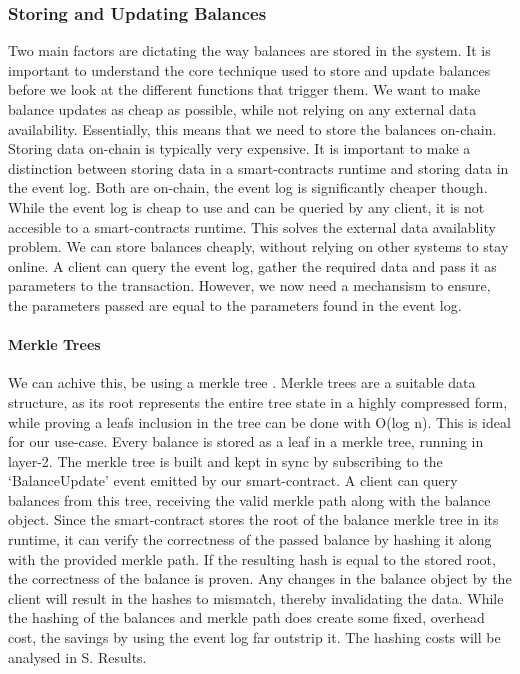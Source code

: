 \documentclass[../../thesis.tex]{subfiles}
\begin{document}
\subsubsection{Storing and Updating Balances} \label{balances}
Two main factors are dictating the way balances are stored in the system. It is important to understand the core technique used to store and update balances before we look at the different functions that trigger them. We want to make balance updates as cheap as possible, while not relying on any external data availability. Essentially, this means that we need to store the balances on-chain. Storing data on-chain is typically very expensive. It is important to make a distinction between storing data in a smart-contracts runtime and storing data in the event log. Both are on-chain, the event log is significantly cheaper though. While the event log is cheap to use and can be queried by any client, it is not accesible to a smart-contracts runtime. This solves the external data availablity problem. We can store balances cheaply, without relying on other systems to stay online. A client can query the event log, gather the required data and pass it as parameters to the transaction. However, we now need a mechansism to ensure, the parameters passed are equal to the parameters found in the event log. 

\paragraph{Merkle Trees}
We can achive this, be using a merkle tree \cite{szydlo2004merkle}. Merkle trees are a suitable data structure, as its root represents the entire tree state in a highly compressed form, while proving a leafs inclusion in the tree can be done with O(log n). This is ideal for our use-case. Every balance is stored as a leaf in a merkle tree, running in layer-2. The merkle tree is built and kept in sync by subscribing to the `BalanceUpdate' event emitted by our smart-contract. A client can query balances from this tree, receiving the valid merkle path along with the balance object. Since the smart-contract stores the root of the balance merkle tree in its runtime, it can verify the correctness of the passed balance by hashing it along with the provided merkle path. If the resulting hash is equal to the stored root, the correctness of the balance is proven. Any changes in the balance object by the client will result in the hashes to mismatch, thereby invalidating the data. While the hashing of the balances and merkle path does create some fixed, overhead cost, the savings by using the event log far outstrip it. The hashing costs will be analysed in S. Results.
\end{document}
